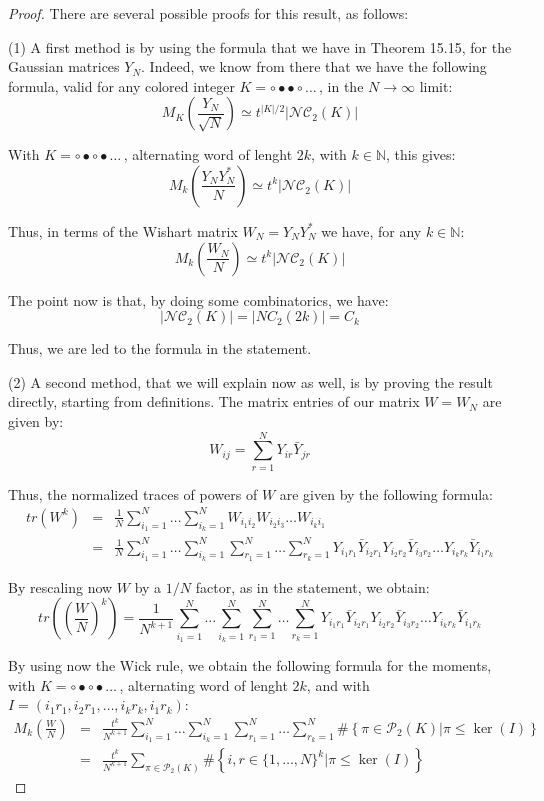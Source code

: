 \documentclass[12pt]{amsbook}
\begin{document}
\begin{proof}
There are several possible proofs for this result, as follows:

\medskip

(1) A first method is by using the formula that we have in Theorem 15.15, for the Gaussian matrices $Y_N$. Indeed, we know from there that we have the following formula, valid for any colored integer $K=\circ\bullet\bullet\circ\ldots\,$, in the $N\to\infty$ limit:
$$M_K\left(\frac{Y_N}{\sqrt{N}}\right)\simeq t^{|K|/2}|\mathcal{NC}_2(K)|$$

With $K=\circ\bullet\circ\bullet\ldots\,$, alternating word of lenght $2k$, with $k\in\mathbb N$, this gives:
$$M_k\left(\frac{Y_NY_N^*}{N}\right)\simeq t^k|\mathcal{NC}_2(K)|$$

Thus, in terms of the Wishart matrix $W_N=Y_NY_N^*$ we have, for any $k\in\mathbb N$:
$$M_k\left(\frac{W_N}{N}\right)\simeq t^k|\mathcal{NC}_2(K)|$$

The point now is that, by doing some combinatorics, we have:
$$|\mathcal{NC}_2(K)|=|NC_2(2k)|=C_k$$

Thus, we are led to the formula in the statement.

\medskip

(2) A second method, that we will explain now as well, is by proving the result directly, starting from definitions. The matrix entries of our matrix $W=W_N$ are given by:
$$W_{ij}=\sum_{r=1}^NY_{ir}\bar{Y}_{jr}$$

Thus, the normalized traces of powers of $W$ are given by the following formula:
\begin{eqnarray*}
tr(W^k)
&=&\frac{1}{N}\sum_{i_1=1}^N\ldots\sum_{i_k=1}^NW_{i_1i_2}W_{i_2i_3}\ldots W_{i_ki_1}\\
&=&\frac{1}{N}\sum_{i_1=1}^N\ldots\sum_{i_k=1}^N\sum_{r_1=1}^N\ldots\sum_{r_k=1}^NY_{i_1r_1}\bar{Y}_{i_2r_1}Y_{i_2r_2}\bar{Y}_{i_3r_2}\ldots Y_{i_kr_k}\bar{Y}_{i_1r_k}
\end{eqnarray*}

By rescaling now $W$ by a $1/N$ factor, as in the statement, we obtain:
$$tr\left(\left(\frac{W}{N}\right)^k\right)=\frac{1}{N^{k+1}}\sum_{i_1=1}^N\ldots\sum_{i_k=1}^N\sum_{r_1=1}^N\ldots\sum_{r_k=1}^NY_{i_1r_1}\bar{Y}_{i_2r_1}Y_{i_2r_2}\bar{Y}_{i_3r_2}\ldots Y_{i_kr_k}\bar{Y}_{i_1r_k}$$

By using now the Wick rule, we obtain the following formula for the moments, with $K=\circ\bullet\circ\bullet\ldots\,$, alternating word of lenght $2k$, and with $I=(i_1r_1,i_2r_1,\ldots,i_kr_k,i_1r_k)$:
\begin{eqnarray*}
M_k\left(\frac{W}{N}\right)
&=&\frac{t^k}{N^{k+1}}\sum_{i_1=1}^N\ldots\sum_{i_k=1}^N\sum_{r_1=1}^N\ldots\sum_{r_k=1}^N\#\left\{\pi\in\mathcal P_2(K)\Big|\pi\leq\ker(I)\right\}\\
&=&\frac{t^k}{N^{k+1}}\sum_{\pi\in\mathcal P_2(K)}\#\left\{i,r\in\{1,\ldots,N\}^k\Big|\pi\leq\ker(I)\right\}
\end{eqnarray*}


\end{proof}
\end{document}
